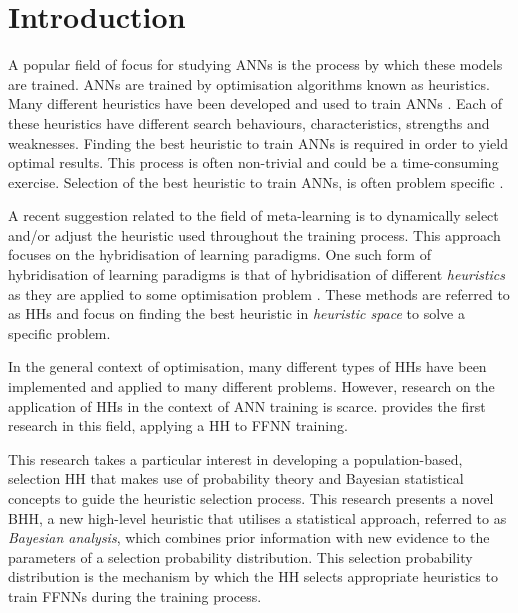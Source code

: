 \section{Introduction}
\label{sec:introduction}

A popular field of focus for studying \acfp{ANN} is the process by which these models are trained. \acp{ANN} are trained by optimisation algorithms known as heuristics. Many different heuristics have been developed and used to train \acp{ANN} \cite{ref:gudise:2003, ref:rakitianskaia:2012, ref:montana:1989}. Each of these heuristics have different search behaviours, characteristics, strengths and weaknesses. Finding the best heuristic to train \acp{ANN} is required in order to yield optimal results. This process is often non-trivial and could be a time-consuming exercise. Selection of the best heuristic to train \acp{ANN}, is often problem specific \cite{ref:allen:1996, ref:drake:2020, ref:pillay:2018}.

A recent suggestion related to the field of meta-learning is to dynamically select and/or adjust the heuristic used throughout the training process. This approach focuses on the hybridisation of learning paradigms. One such form of hybridisation of learning paradigms is that of hybridisation of different \textit{heuristics} as they are applied to some optimisation problem \cite{ref:burke:2013}. These methods are referred to as \acfp{HH} and focus on finding the best heuristic in \textit{heuristic space} to solve a specific problem.

In the general context of optimisation, many different types of \acp{HH} have been implemented and applied to many different problems. However, research on the application of \acp{HH} in the context of \acs{ANN} training is scarce. \citeauthor{ref:nel:2021} \cite{ref:nel:2021} provides the first research in this field, applying a \acs{HH} to \acs{FFNN} training.

This research takes a particular interest in developing a population-based, selection \acs{HH} that makes use of probability theory and Bayesian statistical concepts to guide the heuristic selection process. This research presents a novel \acf{BHH}, a new high-level heuristic that utilises a statistical approach, referred to as \textit{Bayesian analysis}, which combines prior information with new evidence to the parameters of a selection probability distribution. This selection probability distribution is the mechanism by which the \acs{HH} selects appropriate heuristics to train \acfp{FFNN} during the training process.

